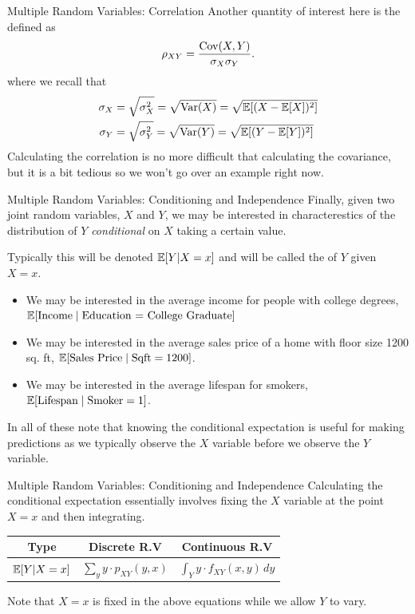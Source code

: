 \documentclass[notheorems,9pt]{beamer}
\begin{document}
\begin{frame}{Multiple Random Variables: Correlation} 
	\label{frame:mrv-correlation}
	Another quantity of interest here is the  defined as 
	\[
		\rho_{XY} = \frac{\operatorname{Cov}(X,Y)}{\sigma_X\sigma_Y} 
	.\] 
	where we recall that
	\begin{align*}
		\sigma_X &= \sqrt{\sigma_X^2} = \sqrt{\operatorname{Var}(X)} = \sqrt{\mathbb{E}[(X-\mathbb{E}[X])^2]} \\
		\sigma_Y &= \sqrt{\sigma_Y^2} = \sqrt{\operatorname{Var}(Y)} = \sqrt{\mathbb{E}[(Y-\mathbb{E}[Y])^2]}
	\end{align*}
	\onslide<2->
	Calculating the correlation is no more difficult that calculating the covariance, but it is a bit tedious so we won't go over an example right now. 
\end{frame}
\begin{frame}{Multiple Random Variables: Conditioning and Independence} 
	\label{frame:mrv-conditioning}
	Finally, given two joint random variables, \(X\) and \(Y\), we may be interested in characterestics of the distribution of \(Y\) \emph{conditional} on \(X\) taking a certain value. 

	Typically this will be denoted \(\mathbb{E}[Y|X=x]\) and will be called the  of \(Y\) given \(X=x\).
	\onslide<2->
	\begin{itemize}
		\item<2-> We may be interested in the average income for people with college degrees, \(\mathbb{E}[\text{Income} \mid \text{Education = College Graduate}]\)
		\item<3-> We may be interested in the average sales price of a home with floor size 1200 sq. ft, \(\mathbb{E}[\text{Sales Price}\mid\text{Sqft} = 1200]\).
		\item<4-> We may be interested in the average lifespan for smokers, \(\mathbb{E}[\text{Lifespan}\mid\text{Smoker}=1]\).
	\end{itemize}
	In all of these note that knowing the conditional expectation is useful for making predictions as we typically observe the \(X\) variable before we observe the \(Y\) variable.
\end{frame}
\begin{frame}{Multiple Random Variables: Conditioning and Independence} 
	\label{frame:mrv-conditioning-formula}
	Calculating the conditional expectation	essentially involves fixing the \(X\) variable at the point \(X=x\) and then integrating.
	{\large 
		\begin{table}[htpb]
		\renewcommand{\arraystretch}{1.5}
		\centering
		\begin{tabular}{c|cc}
			Type  & Discrete R.V & Continuous R.V \\
			\hline
			\(\mathbb{E}[Y|X=x]\) & \(\sum_{y} y\cdot p_{XY}(y,x)\) & \( \int_Y y\cdot f_{XY}(x,y)\,dy\)
		\end{tabular}
		\end{table}}
	 Note that \(X=x\) is fixed in the above equations while we allow \(Y\) to vary. 
\end{frame}
\end{document}
